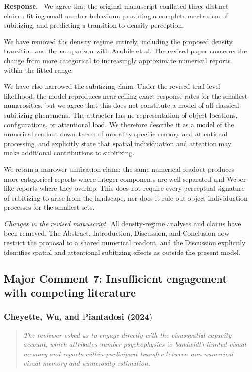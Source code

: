 \documentclass[11pt]{article}
\newenvironment{reviewercomment}{\begin{quote}\color{reviewgray}\itshape}{\end{quote}}
\newenvironment{authorresponse}{\par\noindent\textbf{\color{responseblue}Response.}\ }{\par}
\newcommand{\change}[1]{\par\noindent\textit{Changes in the revised manuscript.} #1\par}
\begin{document}
\begin{authorresponse}
We agree that the original manuscript conflated three distinct claims: fitting small-number behaviour, providing a complete mechanism of subitizing, and predicting a transition to density perception.

We have removed the density regime entirely, including the proposed density transition and the comparison with Anobile et al. The revised paper concerns the change from more categorical to increasingly approximate numerical reports within the fitted range.

We have also narrowed the subitizing claim. Under the revised trial-level likelihood, the model reproduces near-ceiling exact-response rates for the smallest numerosities, but we agree that this does not constitute a model of all classical subitizing phenomena. The attractor has no representation of object locations, configurations, or attentional load. We therefore describe it as a model of the numerical readout downstream of modality-specific sensory and attentional processing, and explicitly state that spatial individuation and attention may make additional contributions to subitizing.

We retain a narrower unification claim: the same numerical readout produces more categorical reports where integer components are well separated and Weber-like reports where they overlap. This does not require every perceptual signature of subitizing to arise from the landscape, nor does it rule out object-individuation processes for the smallest sets.
\end{authorresponse}

\change{All density-regime analyses and claims have been removed. The Abstract, Introduction, Discussion, and Conclusion now restrict the proposal to a shared numerical readout, and the Discussion explicitly identifies spatial and attentional subitizing effects as outside the present model.}

\subsection*{Major Comment 7: Insufficient engagement with competing literature}

\subsubsection*{Cheyette, Wu, and Piantadosi (2024)}

\begin{reviewercomment}
The reviewer asked us to engage directly with the visuospatial-capacity account, which attributes number psychophysics to bandwidth-limited visual memory and reports within-participant transfer between non-numerical visual memory and numerosity estimation.
\end{reviewercomment}
\end{document}
